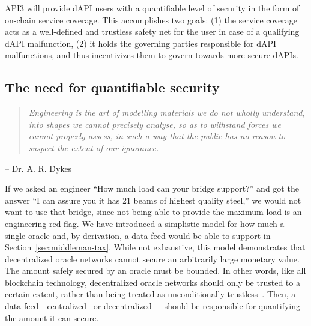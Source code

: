 \documentclass[11pt]{article}
\begin{document}
API3 will provide dAPI users with a quantifiable level of security in the form of on-chain service coverage.
This accomplishes two goals: (1) the service coverage acts as a well-defined and trustless safety net for the user in case of a qualifying dAPI malfunction, (2) it holds the governing parties responsible for dAPI malfunctions, and thus incentivizes them to govern towards more secure dAPIs.

\subsection{The need for quantifiable security}
\label{sec:the-need-for-quantifiable-security}

\begin{quote}
\it
    Engineering is the art of modelling materials we do not wholly understand, into shapes we cannot precisely analyse, so as to withstand forces we cannot properly assess, in such a way that the public has no reason to suspect the extent of our ignorance.
\end{quote}
\begin{flushright}
-- Dr. A. R. Dykes
\end{flushright}

If we asked an engineer ``How much load can your bridge support?'' and got the answer ``I can assure you it has 21 beams of highest quality steel,'' we would not want to use that bridge, since not being able to provide the maximum load is an engineering red flag.
We have introduced a simplistic model for how much a single oracle and, by derivation, a data feed would be able to support in Section~\ref{sec:middleman-tax}.
While not exhaustive, this model demonstrates that decentralized oracle networks cannot secure an arbitrarily large monetary value.
The amount safely secured by an oracle must be bounded.
In other words, like all blockchain technology, decentralized oracle networks should only be trusted to a certain extent, rather than being treated as unconditionally trustless~\cite{defilippi:2020}.
Then, a data feed---centralized~\cite{coinbase} or decentralized~\cite{ellis:2017}---should be responsible for quantifying the amount it can secure.
\end{document}

